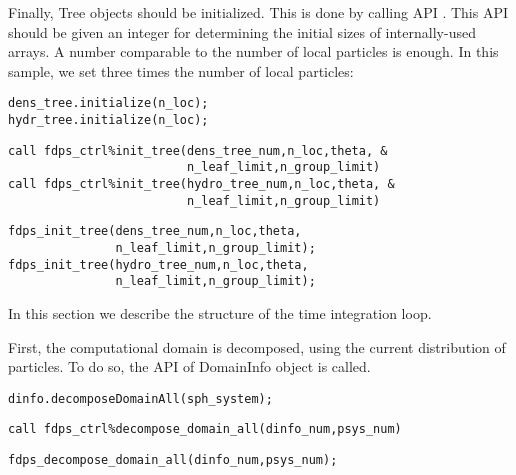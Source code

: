 Finally, \textsf{Tree} objects should be initialized. This is done by calling API \initTree. This API should be given an integer for determining the initial sizes of internally-used arrays. A number comparable to the number of local particles is enough. In this sample, we set three times the number of local particles:
\ifCpp %
\begin{lstlisting}[caption=Initialization of tree objects]
dens_tree.initialize(n_loc);
hydr_tree.initialize(n_loc);
\end{lstlisting}
\endifCpp
\ifFtn %
\begin{lstlisting}[caption=Initialization of tree objects]
call fdps_ctrl%init_tree(dens_tree_num,n_loc,theta, &
                         n_leaf_limit,n_group_limit)
call fdps_ctrl%init_tree(hydro_tree_num,n_loc,theta, &
                         n_leaf_limit,n_group_limit)
\end{lstlisting}
\endifFtn
\ifC %
\begin{lstlisting}[caption=Initialization of tree objects]
fdps_init_tree(dens_tree_num,n_loc,theta,
               n_leaf_limit,n_group_limit);
fdps_init_tree(hydro_tree_num,n_loc,theta,
               n_leaf_limit,n_group_limit);
\end{lstlisting}
\endifC

In this section we describe the structure of the time integration loop.

First, the computational domain is decomposed, using the current distribution of particles. To do so, the API  of \textsf{DomainInfo} object is called.

\ifCpp %
\begin{lstlisting}[caption=Domain Decomposition]
dinfo.decomposeDomainAll(sph_system);
\end{lstlisting}
\endifCpp
\ifFtn %
\begin{lstlisting}[caption=Domain Decomposition]
call fdps_ctrl%decompose_domain_all(dinfo_num,psys_num)
\end{lstlisting}
\endifFtn
\ifC %
\begin{lstlisting}[caption=Domain Decomposition]
fdps_decompose_domain_all(dinfo_num,psys_num);
\end{lstlisting}
\endifC

